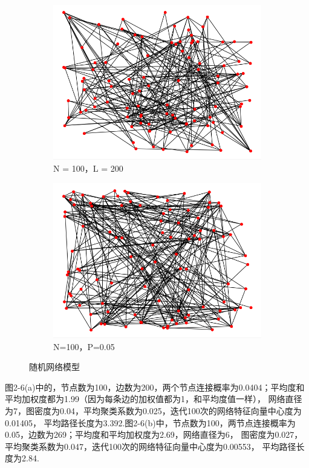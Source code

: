 \documentclass[bachelor,adobefonts]{jnuthesis}
\begin{document}
\begin{figure}[h!]
  \centering 
  \begin{subfigure}[b]{0.49\linewidth}
    \centering
    \includegraphics[width=\linewidth]{WER-4.png}
    \caption{N = 100，L = 200}
  \end{subfigure}
  \begin{subfigure}[b]{0.49\linewidth}
    \centering
    \includegraphics[width=\linewidth]{WER-2.png}
    \caption{N=100，P=0.05}
  \end{subfigure}
  \caption{随机网络模型}
\end{figure}

图2-6(a)中的，节点数为100，边数为200，两个节点连接概率为0.0404；平均度和平均加权度都为1.99（因为每条边的加权值都为1，和平均度值一样），
网络直径为7，图密度为0.04，平均聚类系数为0.025，迭代100次的网络特征向量中心度为0.01405，
平均路径长度为3.392.图2-6(b)中，节点数为100，两节点连接概率为0.05，边数为269；平均度和平均加权度为2.69，网络直径为6，
图密度为0.027，平均聚类系数为0.047，迭代100次的网络特征向量中心度为0.00553，
平均路径长度为2.84.
\end{document}
